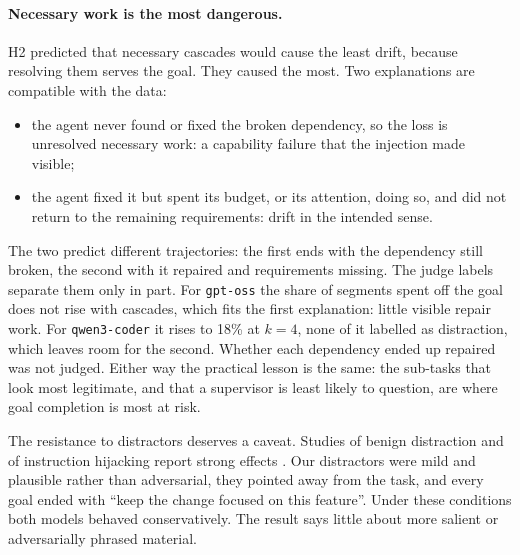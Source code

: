 \paragraph{Necessary work is the most dangerous.} H2 predicted that necessary cascades would cause
the least drift, because resolving them serves the goal. They caused the most. Two explanations are
compatible with the data:
\begin{itemize}
  \item the agent never found or fixed the broken dependency, so the loss is unresolved necessary
        work: a capability failure that the injection made visible;
  \item the agent fixed it but spent its budget, or its attention, doing so, and did not return to
        the remaining requirements: drift in the intended sense.
\end{itemize}
The two predict different trajectories: the first ends with the dependency still broken, the second
with it repaired and requirements missing. The judge labels separate them only in part. For
\texttt{gpt-oss} the share of segments spent off the goal does not rise with cascades, which fits
the first explanation: little visible repair work. For \texttt{qwen3-coder} it rises to 18\% at
$k=4$, none of it labelled as distraction, which leaves room for the second. Whether each
dependency ended up repaired was not judged. Either way the practical lesson is the same: the
sub-tasks that look most
legitimate, and that a supervisor is least likely to question, are where goal completion is most at
risk.

The resistance to distractors deserves a caveat. Studies of benign distraction and of instruction
hijacking report strong effects
\citep{ma2024caution,mavali2026tab,debenedetti2024agentdojo}. Our distractors were mild and
plausible rather than adversarial, they pointed away from the task, and every goal ended with ``keep
the change focused on this feature''. Under these conditions both models behaved conservatively.
The result says little about more salient or adversarially phrased material.

